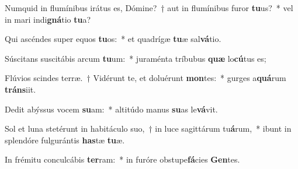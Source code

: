 \item Numquid in flumínibus irátus es, Dómine?~† aut in flumínibus furor \textbf{tu}us?~* vel in mari indi\textbf{gná}tio \textbf{tu}a?
\item Qui ascéndes super equos \textbf{tu}os:~* et quadrígæ \textbf{tu}æ sal\textbf{vá}tio.
\item Súscitans suscitábis arcum \textbf{tu}um:~* juraménta tríbubus \textbf{quæ} lo\textbf{cú}tus es;
\item Flúvios scindes terræ.~† Vidérunt te, et doluérunt \textbf{mon}tes:~* gurges a\textbf{quá}rum \textbf{tráns}iit.
\item Dedit abýssus vocem \textbf{su}am:~* altitúdo manus \textbf{su}as le\textbf{vá}vit.
\item Sol et luna stetérunt in habitáculo suo,~† in luce sagittárum tu\textbf{á}rum,~* ibunt in splendóre fulgurántis \textbf{has}tæ \textbf{tu}æ.
\item In frémitu conculcábis \textbf{ter}ram:~* in furóre obstupe\textbf{fá}cies \textbf{Gen}tes.
